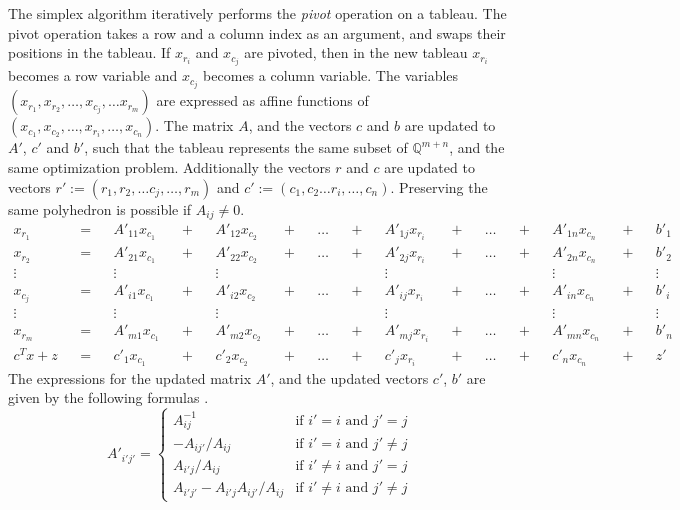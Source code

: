 \documentclass[11pt]{article} %
\begin{document}
The simplex algorithm iteratively performs the \textit{pivot} operation on a tableau. The pivot operation takes a row and a column index as an argument, and swaps their positions in the tableau. If $x_{r_i}$ and $x_{c_j}$ are pivoted, then in the new tableau $x_{r_i}$ becomes a row variable and $x_{c_j}$ becomes a column variable. The variables $(x_{r_1}, x_{r_2}, \dots, x_{c_j}, \dots x_{r_m})$ are expressed as affine functions of $(x_{c_1}, x_{c_2}, \dots, x_{r_i}, \dots, x_{c_n})$. The matrix $A$, and the vectors $c$ and $b$ are updated to $A'$, $c'$ and $b'$, such that the tableau represents the same subset of $\mathbb{Q}^{m + n}$, and the same optimization problem. Additionally the vectors $r$ and $c$ are updated to vectors $r' := (r_1, r_2, \dots c_j, \dots, r_m)$ and $c' := (c_1, c_2 \dots r_i, \dots, c_n)$.
 Preserving the same polyhedron is possible if $A_{ij} \ne 0$.
\begin{equation}
  \begin{aligned}
    x_{r_1} && = && A'_{11}x_{c_1} && + && A'_{12}x_{c_2} && + && \dots && + && A'_{1j}x_{r_i} && + && \dots && + && A'_{1n}x_{c_n} && + && b'_1\\
    x_{r_2} && = && A'_{21}x_{c_1} && + && A'_{22}x_{c_2} && + && \dots && + && A'_{2j}x_{r_i} && + && \dots && + && A'_{2n}x_{c_n} && + && b'_2\\
    \vdots && && \vdots && && \vdots && && && && \vdots && && && && \vdots && && \vdots \\
    x_{c_j} && = && A'_{i1}x_{c_1} && + && A'_{i2}x_{c_2} && + && \dots && + && A'_{ij}x_{r_i}&& + && \dots && + && A'_{in}x_{c_n} && + && b'_i\\
    \vdots && && \vdots && && \vdots && && && && \vdots && && && && \vdots && && \vdots \\
    x_{r_m} && = && A'_{m1}x_{c_1} && + && A'_{m2}x_{c_2} && + && \dots && + && A'_{mj}x_{r_i}&& + && \dots && + && A'_{mn}x_{c_n} && + && b'_n\\
    c^Tx + z && = && c'_1x_{c_1} && + && c'_2x_{c_2} && + && \dots && + && c'_jx_{r_i} && + && \dots && + && c'_nx_{c_n} && + && z'
  \end{aligned}
\end{equation}
The expressions for the updated matrix $A'$, and the updated vectors $c'$, $b'$ are given by the following formulas \cite{Nelson:1980:TPV:909447}.
\begin{equation}\label{eqn:pivot_tableau}
A'_{i'j'} = \begin{cases}
  A_{ij}^{-1} & \text{if } i' = i \text{ and } j' = j \\
  -A_{ij'}/A_{ij} & \text{if } i' = i \text{ and } j' \ne j \\
  A_{i'j}/A_{ij} & \text{if } i' \ne i \text{ and } j' = j \\
  A_{i'j'} - A_{i'j}A_{ij'}/A_{ij}  & \text{if } i' \ne i \text{ and } j' \ne j
\end{cases}
\end{equation}
\end{document}
